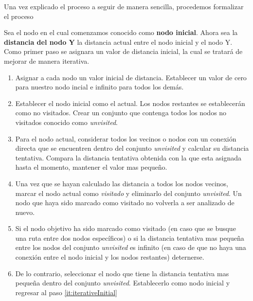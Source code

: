 \documentclass[10pt]{article}
\begin{document}
Una vez explicado el proceso a seguir de manera sencilla, procedemos formalizar el proceso





\begin{mdframed}

Sea el nodo en el cual comenzamos conocido como \textbf{nodo inicial}. Ahora sea la \textbf{distancia del nodo Y} la distancia actual entre el nodo inicial y el nodo Y. Como primer paso se asignara un valor de distancia inicial, la cual se tratará de mejorar de manera iterativa.


\begin{enumerate}[]

	\item Asignar a cada nodo un valor inicial de distancia. Establecer un valor de cero para nuestro nodo incial e infinito para todos los demás.
	
	\item Establecer el nodo inicial como el actual. Los nodos restantes se establecerán como no visitados. Crear un conjunto que contenga todos los nodos no visitados conocido como \emph{unvisited}.
	
	\item \label{it:iterativeInitial} Para el nodo actual, considerar todos los vecinos o nodos con un conexión directa que se encuentren dentro del conjunto \emph{unvisited} y calcular su distancia tentativa. Compara la distancia tentativa obtenida con la que esta asignada hasta el momento, mantener el valor mas pequeño.
	
	\item Una vez que se hayan calculado las distancia a todos los nodos vecinos, marcar el nodo actual como \emph{visitado} y eliminarlo del conjunto \emph{unvisited}. Un nodo que haya sido marcado como visitado no volverla a ser analizado de nuevo.
	
	\item Si el nodo objetivo ha sido marcado como visitado (en caso que se busque una ruta entre dos nodos específicos) o si la distancia tentativa mas pequeña entre los nodos del conjunto \emph{unvisited} es infinito (en caso de que no haya una conexión entre el nodo inicial y los nodos restantes) deternerse.
	
	\item De lo contrario, seleccionar el nodo que tiene la distancia tentativa mas pequeña dentro del conjunto \emph{unvisited}. Establecerlo como nodo inicial y regresar al paso \ref{it:iterativeInitial}
	
\end{enumerate}

\end{mdframed}
\end{document}
